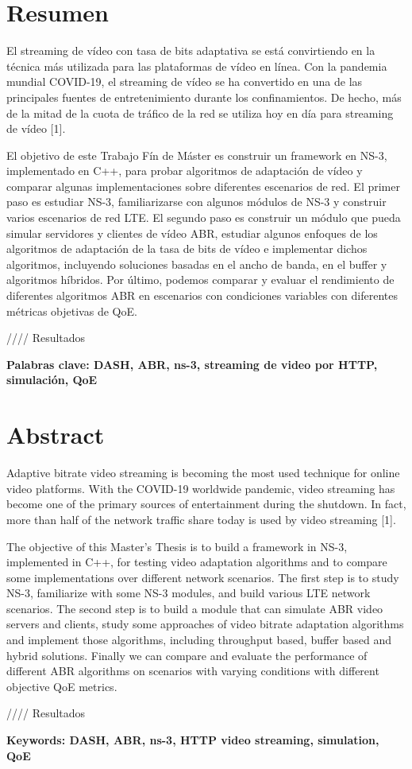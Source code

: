 \cleardoublepage
{}
\chapter*{Resumen}

El streaming de vídeo con tasa de bits adaptativa se está convirtiendo 
en la técnica más utilizada para las plataformas de vídeo en línea. 
Con la pandemia mundial COVID-19, el streaming de vídeo se ha convertido 
en una de las principales fuentes de entretenimiento durante los confinamientos. 
De hecho, más de la mitad de la cuota de tráfico de la red se utiliza hoy en 
día para streaming de vídeo [1].

El objetivo de este Trabajo Fín de Máster es construir un framework en NS-3,
implementado en C++, para probar algoritmos de adaptación de vídeo y comparar
algunas implementaciones sobre diferentes escenarios de red. El primer paso 
es estudiar NS-3, familiarizarse con algunos módulos de NS-3 y construir varios 
escenarios de red LTE. El segundo paso es construir un módulo que pueda simular 
servidores y clientes de vídeo ABR, estudiar algunos enfoques de los algoritmos
de adaptación de la tasa de bits de vídeo e implementar dichos algoritmos, 
incluyendo soluciones basadas en el ancho de banda, en el buffer y algoritmos 
híbridos. 
Por último, podemos comparar y evaluar el rendimiento de diferentes algoritmos 
ABR en escenarios con condiciones variables con diferentes métricas objetivas 
de QoE.

//// Resultados


\vfill
\textbf{Palabras clave: DASH, ABR, ns-3, streaming de video por HTTP, simulación, QoE} 


\cleardoublepage
{}
\chapter*{Abstract}

Adaptive bitrate video streaming is becoming the most used technique for online
video platforms. With the COVID-19 worldwide pandemic, video streaming has become
one of the primary sources of entertainment during the shutdown. In fact, more
than half of the network traffic share today is used by video streaming [1].

The objective of this Master's Thesis is to build a framework in NS-3, implemented
in C++, for testing video adaptation algorithms and to compare some implementations
over different network scenarios. The first step is to study NS-3, familiarize with
some NS-3 modules, and build various LTE network scenarios. The second step is to
build a module that can simulate ABR video servers and clients, study some approaches
of video bitrate adaptation algorithms and implement those algorithms, including
throughput based, buffer based and hybrid solutions. Finally we can compare and 
evaluate the performance of different ABR algorithms on scenarios with varying 
conditions with different objective QoE metrics.

//// Resultados


\vfill
\textbf{Keywords: DASH, ABR, ns-3, HTTP video streaming, simulation, QoE} 